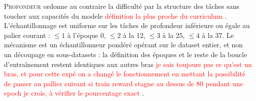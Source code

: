 \documentclass[11pt,a4paper]{article}
\begin{document}
\textsc{Profondeur} ordonne au contraire la difficulté par la structure des tâches sans toucher aux capacités du modele \textcolor{red}{définition la plus proche du curriculum} . L'échantillonnage est uniforme sur les tâches de profondeur inférieure ou égale au palier courant : $\leq 1$ à l'époque 0, $\leq 2$ à la 12, $\leq 3$ à la 25, $\leq 4$ à la 37. Le mécanisme est un échantillonneur pondéré opérant sur le dataset entier, et non un découpage en sous-datasets : la définition des époques et le reste de la boucle d'entraînement restent identiques aux autres bras \textcolor{red}{je sais toujours pas ce qu'est un bras, et pour cette expé on a changé le fonctionnement en mettant la possibilité de passer au pallier suivant si train reward stagne au dessus de 80 pendant une epoch je crois, à vérifier le pourcentage exact } .
\end{document}
